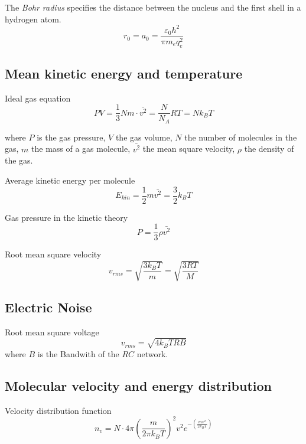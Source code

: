 
The \emph{Bohr radius} specifies the distance between the nucleus and the first shell in a hydrogen atom.
\begin{equation}
	r_0 = a_0 = \frac{\varepsilon_0 h^2}{\pi m_e q_e^2}
\end{equation}

\subsection{Mean kinetic energy and temperature}
Ideal gas equation
\begin{equation}
	PV = \frac{1}{3} Nm \cdot \bar{v^2} = \frac{N}{N_A}RT = N k_B T
\end{equation}

where $P$ is the gas pressure, $V$ the gas volume, $N$ the number of molecules in the gas,
$m$ the mass of a gas molecule, $\bar{v^2}$ the mean square velocity, $\rho$ the density of the gas.

Average kinetic energy per molecule
\begin{equation}
	E_{kin} = \frac{1}{2} m \bar{v^2} = \frac{3}{2} k_B T
\end{equation}

Gas pressure in the kinetic theory
\begin{equation}
	P = \frac{1}{3} \rho \bar{v^2}
\end{equation}

Root mean square velocity
\begin{equation}
	v_{rms} = \sqrt{\frac{3 k_B T}{m}} = \sqrt{\frac{3RT}{M}}
\end{equation}

\subsection{Electric Noise}
Root mean square voltage
\begin{equation}
	v_{rms}  = \sqrt{4 k_B T R B}
\end{equation}
where $B$ is the Bandwith of the $RC$ network.

\subsection{Molecular velocity and energy distribution}
Velocity distribution function
\begin{equation}
	n_v = N \cdot 4 \pi \left(\frac{m}{2\pi k_B T}\right)^2 v^2 e^{-\left(\frac{m v^2}{2 k_B T}\right)}
\end{equation}

